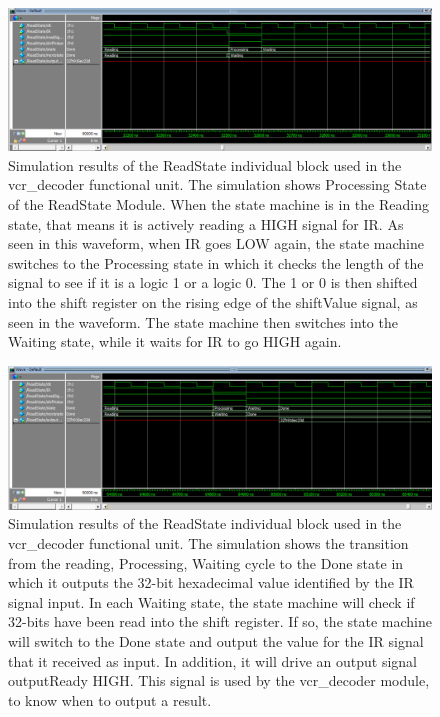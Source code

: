 \documentclass[a4paper]{article}
\begin{document}
\begin{figure}[h]
  \centering
  \includegraphics[width=.98\textwidth]{sims/vcr_testing/moduleTests/ReadState/PROCESSING_State.png}
  \caption{Simulation results of the ReadState individual block used in the vcr\_decoder functional unit. The simulation shows Processing State of the ReadState Module. When the state machine is in the Reading state, that means it is actively reading a HIGH signal for IR. As seen in this waveform, when IR goes LOW again, the state machine switches to the Processing state in which it checks the length of the signal to see if it is a logic 1 or a logic 0. The 1 or 0 is then shifted into the shift register on the rising edge of the shiftValue signal, as seen in the waveform. The state machine then switches into the Waiting state, while it waits for IR to go HIGH again.}
    \label{fig:individual-1-2-sim}
\end{figure}
\begin{figure}[h]
  \centering
  \includegraphics[width=.98\textwidth]{sims/vcr_testing/moduleTests/ReadState/Transition_to_DONE.png}
  \caption{Simulation results of the ReadState individual block used in the vcr\_decoder functional unit. The simulation shows the transition from the reading, Processing, Waiting cycle to the Done state in which it outputs the 32-bit hexadecimal value identified by the IR signal input. In each Waiting state, the state machine will check if 32-bits have been read into the shift register. If so, the state machine will switch to the Done state and output the value for the IR signal that it received as input. In addition, it will drive an output signal outputReady HIGH. This signal is used by the vcr\_decoder module, to know when to output a result.}
    \label{fig:individual-1-2-sim}
\end{figure}
\end{document}
